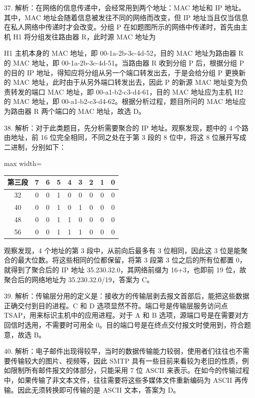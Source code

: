 \documentclass[UTF8,11pt]{ctexart}
\begin{document}
37. 解析：在网络的信息传递中，会经常用到两个地址：MAC 地址和 IP 地址。其中，MAC 地址会随着信息被发往不同的网络而改变，但 IP 地址当且仅当信息在私人网络中传递时才会改变。分组 P 在如题图所示的网络中传递时，首先由主机 H1 将分组发往路由器 R，此时源 MAC 地址为


H1 主机本身的 MAC 地址，即 00-1a-2b-3c-4d-52，目的 MAC 地址为路由器 R 的 MAC 地址，即 00-1a-2b-3c-4d-51。当路由器 R 收到分组 P 后，根据分组 P 的目的 IP 地址，得知应将分组从另一个端口转发出去，于是会给分组 P 更换新的 MAC 地址，此时由于从另外端口转发出去，因此 P 的新源 MAC 地址变为负责转发的端口 MAC 地址，即 00-a1-b2-c3-d4-61，目的 MAC 地址应为主机 H2 的 MAC 地址，即 00-a1-b2-c3-d4-62。根据分析过程，题目所问的 MAC 地址应为路由器 R 两个端口的 MAC 地址，故选 D。


38. 解析：对于此类题目，先分析需要聚合的 IP 地址。观察发现，题中的 4 个路由地址，前 16 位完全相同，不同之处在于第 3 段的 8 位中，将这 8 位展开写成二进制，分别如下：


\begin{center}\begin{adjustbox}{max width=\linewidth}\begin{tabular}{|c|c|c|c|c|c|c|c|c|}\hline
第三段 & 7 & 6 & 5 & 4 & 3 & 2 & 1 & 0\\\hline
32 & 0 & 0 & 1 & 0 & 0 & 0 & 0 & 0\\\hline
40 & 0 & 0 & 1 & 0 & 1 & 0 & 0 & 0\\\hline
48 & 0 & 0 & 1 & 1 & 0 & 0 & 0 & 0\\\hline
56 & 0 & 0 & 1 & 1 & 1 & 0 & 0 & 0\\\hline\end{tabular}\end{adjustbox}\end{center}

观察发现，4 个地址的第 3 段中，从前向后最多有 3 位相同，因此这 3 位是能聚合的最大位数。将这些相同的位都保留，将第 3 段第 3 位之后的所有位都置 0，就得到了聚合后的 IP 地址 35.230.32.0，其网络前缀为 16+3，也即前 19 位，故聚合后的网络地址为 35.230.32.0/19，答案为 C。


39. 解析：传输层分用的定义是：接收方的传输层剥去报文首部后，能把这些数据正确交付到目的进程。C 和 D 选项显然不符。端口号是传输层服务访问点 TSAP，用来标识主机中的应用进程。对于 A 和 B 选项，源端口号是在需要对方回信时选用，不需要时可用全 0。目的端口号是在终点交付报文时使用到，符合题意，故选 B。


40. 解析：电子邮件出现得较早，当时的数据传输能力较弱，使用者们往往也不需要传输较大的图片、视频等，因此 SMTP 具有一些目前来看较为老旧的性质，例如限制所有邮件报文的体部分，只能采用 7 位 ASCII 来表示。在如今的传输过程中，如果传输了非文本文件，往往需要将这些多媒体文件重新编码为 ASCII 再传输。因此无须转换即可传输的是 ASCII 文本，答案为 D。
\end{document}
